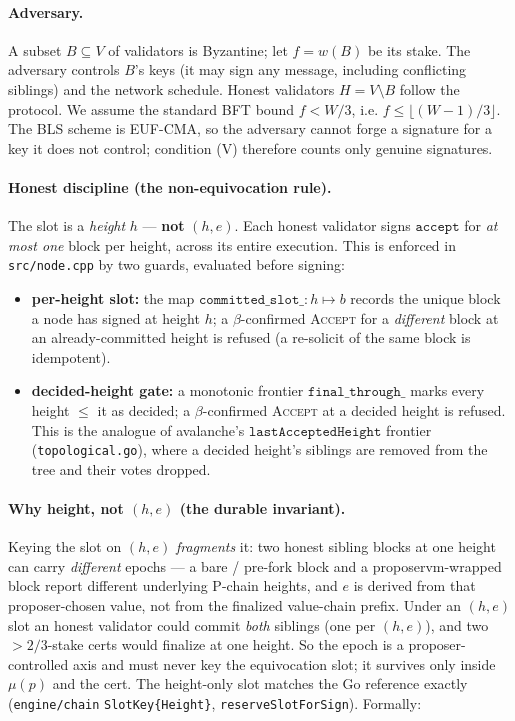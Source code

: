 \documentclass[11pt]{article}
\begin{document}
\paragraph{Adversary.}
A subset $B\subseteq V$ of validators is Byzantine; let $f=w(B)$ be its stake. The
adversary controls $B$'s keys (it may sign any message, including conflicting
siblings) and the network schedule. Honest validators $H=V\setminus B$ follow the
protocol. We assume the standard BFT bound $f < W/3$, i.e. $f \le \lfloor (W-1)/3\rfloor$.
The BLS scheme is EUF-CMA, so the adversary cannot forge a signature for a key it
does not control; condition (V) therefore counts only genuine signatures.

\paragraph{Honest discipline (the non-equivocation rule).}
The slot is a \emph{height} $h$ --- \textbf{not} $(h,e)$. Each honest validator signs
$\texttt{accept}$ for \emph{at most one} block per height, across its entire execution.
This is enforced in \texttt{src/node.cpp} by two guards, evaluated before signing:
\begin{itemize}
  \item \textbf{per-height slot:} the map $\texttt{committed\_slot\_}:h\mapsto b$ records
        the unique block a node has signed at height $h$; a $\beta$-confirmed
        \textsc{Accept} for a \emph{different} block at an already-committed height is
        refused (a re-solicit of the same block is idempotent).
  \item \textbf{decided-height gate:} a monotonic frontier $\texttt{final\_through\_}$
        marks every height $\le$ it as decided; a $\beta$-confirmed \textsc{Accept} at a
        decided height is refused. This is the analogue of avalanche's
        $\texttt{lastAcceptedHeight}$ frontier (\texttt{topological.go}), where a decided
        height's siblings are removed from the tree and their votes dropped.
\end{itemize}

\paragraph{Why height, not $(h,e)$ (the durable invariant).}
Keying the slot on $(h,e)$ \emph{fragments} it: two honest sibling blocks at one height
can carry \emph{different} epochs --- a bare / pre-fork block and a proposervm-wrapped
block report different underlying P-chain heights, and $e$ is derived from that
proposer-chosen value, not from the finalized value-chain prefix. Under an $(h,e)$ slot an
honest validator could commit \emph{both} siblings (one per $(h,e)$), and two
$>\!2/3$-stake certs would finalize at one height. So the epoch is a proposer-controlled
axis and must never key the equivocation slot; it survives only inside $\mu(p)$ and the
cert. The height-only slot matches the Go reference exactly (\texttt{engine/chain}
\texttt{SlotKey\{Height\}}, \texttt{reserveSlotForSign}). Formally:
\end{document}
